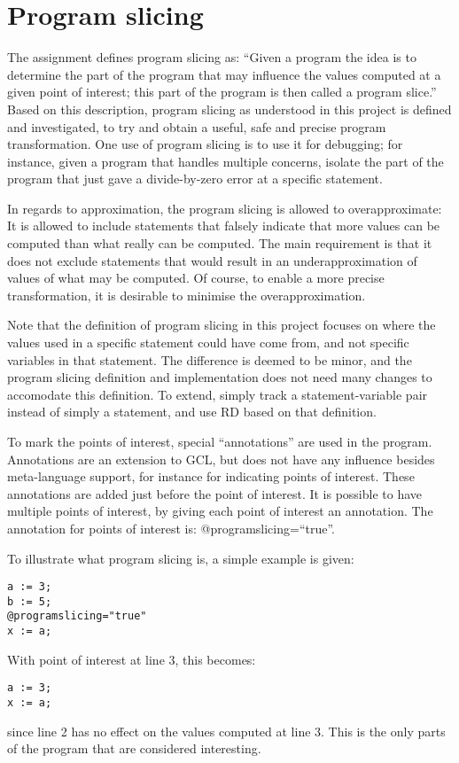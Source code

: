 \section{Program slicing}

The assignment defines program slicing as:
``Given a program the idea is to determine the part of the program that may influence the values
computed at a given point of interest; this part of the program is then called a program slice.''
Based on this description, program slicing as understood in this project is defined and investigated,
to try and obtain a useful, safe and precise program transformation.
One use of program slicing is to use it for debugging; for instance, given a program that handles
multiple concerns, isolate the part of the program that just gave a divide-by-zero error at a
specific statement.

In regards to approximation, the program slicing is allowed to overapproximate: It is allowed to include statements
that falsely indicate that more values can be computed than what really can be computed.
The main requirement is that it does not exclude statements that would result in an underapproximation
of values of what may be computed. Of course, to enable a more precise transformation, it is desirable
to minimise the overapproximation.

Note that the definition of program slicing in this project focuses on
where the values used in a specific statement could have come from, and not
specific variables in that statement. The difference is deemed to be minor, and the
program slicing definition and implementation does not need many
changes to accomodate this definition. To extend, simply track a statement-variable
pair instead of simply a statement, and use RD based on that definition.

To mark the points of interest, special ``annotations'' are used in the program.
Annotations are an extension to GCL, but does not have any influence besides
meta-language support, for instance for indicating points of interest.
These annotations are added just before the point of interest. It is possible
to have multiple points of interest, by giving each point of interest an annotation.
The annotation for points of interest is: @programslicing=``true''.

To illustrate what program slicing is, a simple example is given:
\begin{lstlisting}
a := 3;
b := 5;
@programslicing="true"
x := a;
\end{lstlisting}
With point of interest at line 3, this becomes:
\begin{lstlisting}
a := 3;
x := a;
\end{lstlisting}
since line 2 has no effect on the values computed at line 3.
This is the only parts of the program that are considered interesting.

